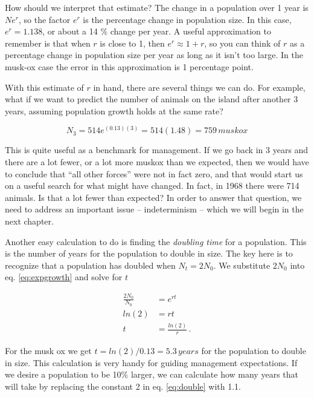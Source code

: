 \documentclass[]{book}
\begin{document}
How should we interpret that estimate? The change in a population over 1
year is \(Ne^r\), so the factor \(e^r\) is the percentage change in
population size. In this case, \(e^r = 1.138\), or about a 14 \% change
per year. A useful approximation to remember is that when \(r\) is close
to 1, then \(e^{r} \approx 1+r\), so you can think of \(r\) as a
percentage change in population size per year as long as it isn't too
large. In the musk-ox case the error in this approximation is 1
percentage point.

With this estimate of \(r\) in hand, there are several things we can do.
For example, what if we want to predict the number of animals on the
island after another 3 years, assuming population growth holds at the
same rate?

\begin{equation}
N_3 = 514 e^{(0.13)(3)} = 514(1.48) = 759\,muskox
\end{equation}

This is quite useful as a benchmark for management. If we go back in 3
years and there are a lot fewer, or a lot more muskox than we expected,
then we would have to conclude that ``all other forces'' were not in
fact zero, and that would start us on a useful search for what might
have changed. In fact, in 1968 there were 714 animals. Is that a lot
fewer than expected? In order to answer that question, we need to
address an important issue -- indeterminism -- which we will begin in
the next chapter.

Another easy calculation to do is finding the \emph{doubling time} for a
population. This is the number of years for the population to double in
size. The key here is to recognize that a population has doubled when
\(N_t = 2N_0\). We substitute \(2N_0\) into eq. \eqref{eq:expgrowth} and
solve for \(t\)

\begin{equation}
\begin{split}
\frac{2N_0}{N_0} & = e^{rt} \\
ln\left(2\right)  & = rt \\
t & = \frac{ln\left(2\right)}{r}\,.
\end{split}
\label{eq:double}
\end{equation}

For the musk ox we get \(t = ln(2)/0.13 = 5.3 \, years\) for the
population to double in size. This calculation is very handy for guiding
management expectations. If we desire a population to be 10\% larger, we
can calculate how many years that will take by replacing the constant 2
in eq. \eqref{eq:double} with 1.1.
\end{document}
